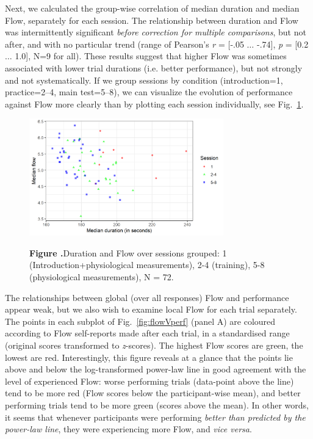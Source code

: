 \documentclass{frontierstyle/frontiersSCNS}
\newcommand{\nicewidth}{0.75\textwidth}
\begin{document}
Next, we calculated the group-wise correlation of median duration and median Flow, separately for each session. The relationship between duration and Flow was intermittently significant {\it before correction for multiple comparisons}, but not after, and with no particular trend (range of Pearson's {\it r} = [-.05 $\dots$ -.74], {\it p} = [0.2 $\dots$ 1.0], N=9 for all). These results suggest that higher Flow was sometimes associated with lower trial durations (i.e. better performance), but not strongly and not systematically. If we group sessions by condition (introduction=1, practice=2--4, main test=5--8), we can visualize the evolution of performance against Flow more clearly than by plotting each session individually, see Fig.~\ref{fig:FlowVdurXssn}.%

\begin{figure}[!t]
\begin{center}
  \includegraphics[width=\nicewidth]{5_session_flowDuration_v3}
\end{center}
  \textbf{\label{fig:FlowVdurXssn} Figure .}{Duration and Flow over sessions grouped: 1 (Introduction+physiological measurements), 2-4 (training), 5-8 (physiological measurements), N = 72.}
\end{figure}

The relationships between global (over all responses) Flow and performance appear weak, but we also wish to examine local Flow for each trial separately. The points in each subplot of Fig.~\ref{fig:flowVperf} (panel A) are coloured according to Flow self-reports made after each trial, in a standardised range (original scores transformed to {\it z}-scores). The highest Flow scores are green, the lowest are red. Interestingly, this figure reveals at a glance that the points lie above and below the log-transformed power-law line in good agreement with the level of experienced Flow: worse performing trials (data-point above the line) tend to be more red (Flow scores below the participant-wise mean), and better performing trials tend to be more green (scores above the mean). In other words, it seems that whenever participants were performing {\it better than predicted by the power-law line}, they were experiencing more Flow, and {\it vice versa}.
\end{document}
